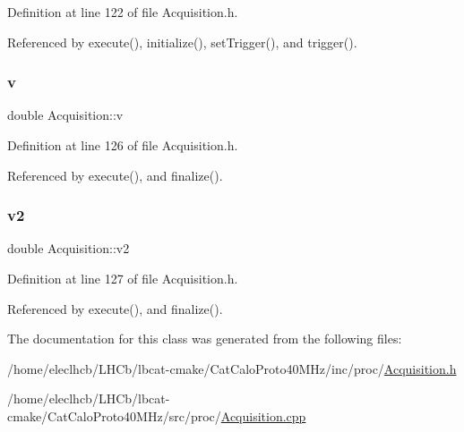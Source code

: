 Definition at line 122 of file Acquisition.\+h.



Referenced by execute(), initialize(), set\+Trigger(), and trigger().

\mbox{\label{classAcquisition_ac855680c9bb5f8f14d505d5f41f1a076}} 
\subsubsection{\texorpdfstring{v}{v}}
{\footnotesize\ttfamily double Acquisition\+::v\hspace{0.3cm}{\ttfamily [private]}}



Definition at line 126 of file Acquisition.\+h.



Referenced by execute(), and finalize().

\mbox{\label{classAcquisition_a8d2cd605d4982223356a14423d735c84}} 
\subsubsection{\texorpdfstring{v2}{v2}}
{\footnotesize\ttfamily double Acquisition\+::v2\hspace{0.3cm}{\ttfamily [private]}}



Definition at line 127 of file Acquisition.\+h.



Referenced by execute(), and finalize().



The documentation for this class was generated from the following files\+:\begin{DoxyCompactItemize}
\item 
/home/eleclhcb/\+L\+H\+Cb/lbcat-\/cmake/\+Cat\+Calo\+Proto40\+M\+Hz/inc/proc/\hyperlink{CatCaloProto40MHz_2inc_2proc_2Acquisition_8h}{Acquisition.\+h}\item 
/home/eleclhcb/\+L\+H\+Cb/lbcat-\/cmake/\+Cat\+Calo\+Proto40\+M\+Hz/src/proc/\hyperlink{CatCaloProto40MHz_2src_2proc_2Acquisition_8cpp}{Acquisition.\+cpp}\end{DoxyCompactItemize}
